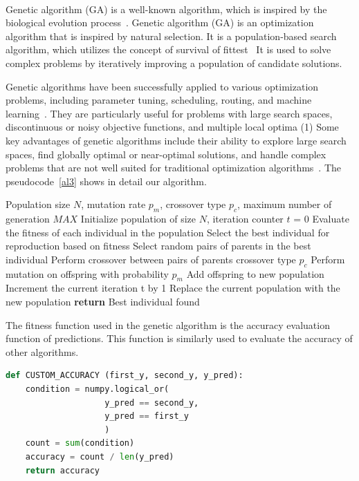 \documentclass[../ICIT-Paper-2024.tex]{subfiles}
\begin{document}
\paragraph{}
Genetic algorithm (GA) is a well-known algorithm, which is inspired by the biological evolution process~\cite{kingma2014adam}. Genetic algorithm (GA) is an optimization algorithm that is inspired by natural selection. It is a population-based search algorithm, which utilizes the concept of survival of fittest~\cite{zbMATH03584897} It is used to solve complex problems by iteratively improving a population of candidate solutions. 

Genetic algorithms have been successfully applied to various optimization problems, including parameter tuning, scheduling, routing, and machine learning~\cite{katoch2021review}. They are particularly useful for problems with large search spaces, discontinuous or noisy objective functions, and multiple local optima (1) Some key advantages of genetic algorithms include their ability to explore large search spaces, find globally optimal or near-optimal solutions, and handle complex problems that are not well suited for traditional optimization algorithms~\cite{katoch2021review}. The pseudocode~\ref{al3} shows in detail our algorithm.

\begin{algorithm}[H]
\caption{Genetic Algorithm}\label{al3}
\begin{algorithmic}[1]
\Require Population size $N$, mutation rate $p_m$, crossover type $p_c$, maximum number of generation $MAX$
\State Initialize population of size $N$, iteration counter $t$ = 0
    \State Evaluate the fitness of each individual in the population
    \State Select the best individual for reproduction based on fitness 
        \State Select random pairs of parents in the best individual
        \State Perform crossover between pairs of parents crossover type $p_c$
        \State Perform mutation on offspring with probability $p_m$
        \State Add offspring to new population
    \EndWhile
    \State Increment the current iteration t by 1
    \State Replace the current population with the new population
\EndFor
\State \textbf{return} Best individual found
\end{algorithmic}
\end{algorithm}

The fitness function used in the genetic algorithm is the accuracy evaluation function of predictions. This function is similarly used to evaluate the accuracy of other algorithms.


\begin{lstlisting}[language=Python]
def CUSTOM_ACCURACY (first_y, second_y, y_pred):
    condition = numpy.logical_or(
                    y_pred == second_y, 
                    y_pred == first_y
                    )
    count = sum(condition)
    accuracy = count / len(y_pred)
    return accuracy 
\end{lstlisting}
\end{document}
